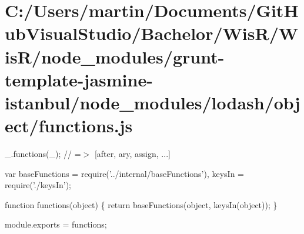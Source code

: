 \hypertarget{_c_1_2_users_2martin_2_documents_2_git_hub_visual_studio_2_bachelor_2_wis_r_2_wis_r_2node_module7a4e7acba1f89856c81e2c072e41eb24}{}\section{C\+:/\+Users/martin/\+Documents/\+Git\+Hub\+Visual\+Studio/\+Bachelor/\+Wis\+R/\+Wis\+R/node\+\_\+modules/grunt-\/template-\/jasmine-\/istanbul/node\+\_\+modules/lodash/object/functions.\+js}
\+\_\+.\+functions(\+\_\+); // =$>$ \mbox{[}\textquotesingle{}after\textquotesingle{}, \textquotesingle{}ary\textquotesingle{}, \textquotesingle{}assign\textquotesingle{}, ...\mbox{]}


\begin{DoxyCodeInclude}
var baseFunctions = require(\textcolor{stringliteral}{'../internal/baseFunctions'}),
    keysIn = require(\textcolor{stringliteral}{'./keysIn'});

\textcolor{keyword}{function} functions(\textcolor{keywordtype}{object}) \{
  \textcolor{keywordflow}{return} baseFunctions(\textcolor{keywordtype}{object}, keysIn(\textcolor{keywordtype}{object}));
\}

module.exports = functions;
\end{DoxyCodeInclude}
 